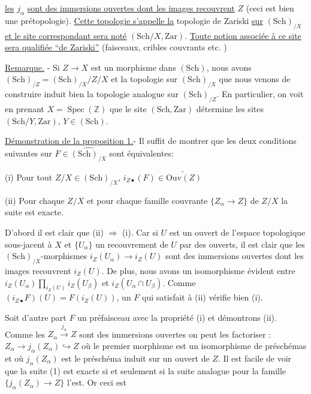 \uline{les} $j_\alpha$ \uline{sont des immersions ouvertes dont les images recouvrent} $Z$ (ceci est bien une prétopologie). \uline{Cette topologie s'appelle la} topologie de Zariski \uline{sur} $(\mathrm{Sch})_{/X}$ \uline{et le site correspondant sera noté} $(\mathrm{Sch}/X,\mathrm{Zar})$. \uline{Toute notion associée à ce site sera qualifiée ``de Zariski''} (faisceaux, cribles couvrants etc. )

\uline{Remarque.} - Si $Z\longrightarrow X$ est un morphisme dans $(\mathrm{Sch})$, nous avons $(\mathrm{Sch})_{/Z}=(\mathrm{Sch})_{/X}\big/ Z/X$ et la topologie sur $(\mathrm{Sch})_{/X}$ que nous venons de construire induit bien la topologie analogue sur $(\mathrm{Sch})_{/Z}$. En particulier, on voit en prenant $X=\operatorname{Spec}(\mathbb{Z})$ que le site $(\mathrm{Sch},\mathrm{Zar})$ détermine les sites $(\mathrm{Sch}/Y,\mathrm{Zar})$, $Y\in(\mathrm{Sch})$.

\uline{Démonstration de la proposition 1.}- Il suffit de montrer que les deux conditions suivantes sur $F\in\widehat{(\mathrm{Sch})_{/X}}$ sont équivalentes:

(i) Pour tout $Z/X\in(\mathrm{Sch})_{/X}$, $i_{Z\bullet}(F)\in\widetilde{\mathrm{Ouv}(Z)}$

(ii) Pour chaque $Z/X$ et pour chaque famille couvrante $\{Z_\alpha\longrightarrow Z\}$ de $Z/X$ la suite
est exacte.

D'abord il est clair que (ii) $\Longrightarrow$ (i). Car si $U$ est un ouvert de l'espace topologique sous-jacent à $X$ et $\{U_\alpha\}$ un recouvrement de $U$ par des ouverts, il est clair que les $(\mathrm{Sch})_{/X}$-morphismes $i_Z(U_\alpha)\longrightarrow i_Z(U)$ sont des immersions ouvertes dont les images recouvrent $i_Z(U)$. De plus, nous avons un isomorphisme évident entre $i_Z(U_\alpha)\mathop{\prod}\limits_{i_Z(U)} i_Z(U_\beta)$ et $i_Z(U_\alpha\cap U_\beta)$. Comme $(i_{Z\bullet}F)(U)=F(i_Z(U))$, un $F$ qui satisfait à (ii) vérifie bien (i).

Soit d'autre part $F$ un préfaisceau avec la propriété (i) et démontrons (ii). Comme les $Z_\alpha\xrightarrow{j_\alpha}Z$ sont des immersions ouvertes on peut les factoriser : $Z_\alpha\longrightarrow j_\alpha(Z_\alpha)\hookrightarrow Z$ où le premier morphisme est un isomorphisme de préschémas et où $j_\alpha(Z_\alpha)$ est le préschéma induit sur un ouvert de $Z$. Il est facile de voir que la suite (1) est exacte si et seulement si la suite analogue pour la famille $\{j_\alpha(Z_\alpha)\longrightarrow Z\}$ l'est. Or ceci est
